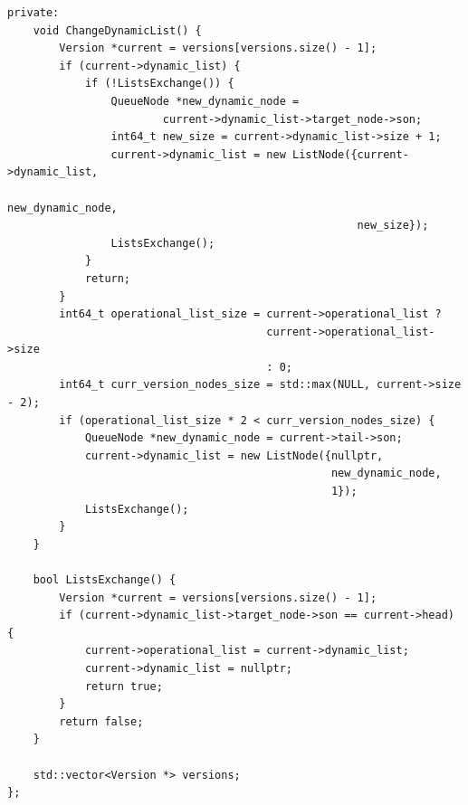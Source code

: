 \documentclass[a4paper,12pt]{extarticle}
\begin{document}
\begin{lstlisting}
private:
    void ChangeDynamicList() {
        Version *current = versions[versions.size() - 1];
        if (current->dynamic_list) {
            if (!ListsExchange()) {
                QueueNode *new_dynamic_node =
                        current->dynamic_list->target_node->son;
                int64_t new_size = current->dynamic_list->size + 1;
                current->dynamic_list = new ListNode({current->dynamic_list,
                                                      new_dynamic_node,
                                                      new_size});
                ListsExchange();
            }
            return;
        }
        int64_t operational_list_size = current->operational_list ?
                                        current->operational_list->size
                                        : 0;
        int64_t curr_version_nodes_size = std::max(NULL, current->size - 2);
        if (operational_list_size * 2 < curr_version_nodes_size) {
            QueueNode *new_dynamic_node = current->tail->son;
            current->dynamic_list = new ListNode({nullptr,
                                                  new_dynamic_node,
                                                  1});
            ListsExchange();
        }
    }

    bool ListsExchange() {
        Version *current = versions[versions.size() - 1];
        if (current->dynamic_list->target_node->son == current->head) {
            current->operational_list = current->dynamic_list;
            current->dynamic_list = nullptr;
            return true;
        }
        return false;
    }

    std::vector<Version *> versions;
};
\end{lstlisting}
\end{document}
